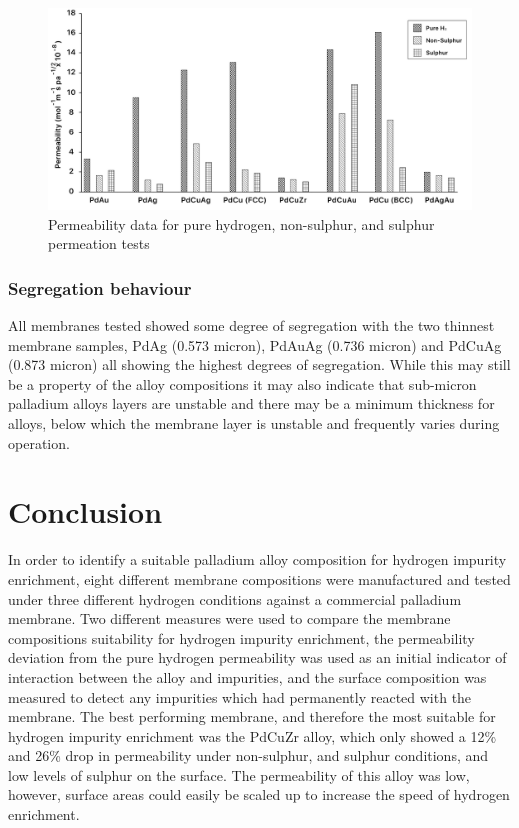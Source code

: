 \begin{figure}
    \includegraphics[width=\linewidth]{figures/permeabilitychart.png}
    \caption{Permeability data for pure hydrogen, non-sulphur, and sulphur permeation tests}
    \label{permgraph}
  \end{figure}

\subsubsection{Segregation behaviour}
All membranes tested showed some degree of segregation with the two thinnest membrane samples, PdAg (0.573 micron), PdAuAg (0.736  micron) and PdCuAg (0.873 micron) all showing the highest degrees of segregation. While this may still be a property of the alloy compositions it may also indicate that sub-micron palladium alloys layers are unstable and there may be a minimum thickness for alloys, below which the membrane layer is unstable and frequently varies during operation.

\section{Conclusion}
In order to identify a suitable palladium alloy composition for hydrogen impurity enrichment, eight different membrane compositions were manufactured and tested under three different hydrogen conditions against a commercial palladium membrane. Two different measures were used to compare the membrane compositions suitability for hydrogen impurity enrichment, the permeability deviation from the pure hydrogen permeability was used as an initial indicator of interaction between the alloy and impurities, and the surface composition was measured to detect any impurities which had permanently reacted with the membrane. 
The best performing membrane, and therefore the most suitable for hydrogen impurity enrichment was the PdCuZr alloy, which only showed a 12\% and 26\% drop in permeability under non-sulphur, and sulphur conditions, and low levels of sulphur on the surface.  The permeability of this alloy was low, however, surface areas could easily be scaled up to increase the speed of hydrogen enrichment. 


